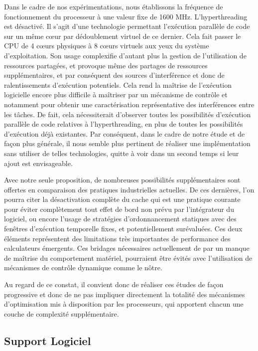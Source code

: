 \documentclass[french, a4paper, 11pt, twoside, pdftex]{StyleThese}
\begin{document}
		Dans le cadre de nos expérimentations, nous établissons la fréquence de fonctionnement du processeur à une valeur fixe de 1600 MHz. L'hyperthreading est désactivé. Il s'agit d'une technologie permettant l'exécution parallèle de code sur un même cœur par dédoublement virtuel de ce dernier. Cela fait passer  le CPU de 4 cœurs physiques à 8 cœurs virtuels aux yeux du système d'exploitation. Son usage complexifie d'autant plus la gestion de l'utilisation de ressources partagées, et provoque même des partages de ressources supplémentaires, et par conséquent des sources d'interférence et donc de ralentissements d'exécution potentiels. Cela rend la maîtrise de l'exécution logicielle encore plus difficile à maîtriser par un mécanisme de contrôle et notamment pour obtenir une caractérisation représentative des interférences entre les tâches. De fait, cela nécessiterait d'observer toutes les possibilités d'exécution parallèle de code relatives à l'hyperthreading, en plus de toutes les possibilités d'exécution déjà existantes. Par conséquent, dans le cadre de notre étude et de façon plus générale, il nous semble plus pertinent de réaliser une implémentation sans utiliser de telles technologies, quitte à voir dans un second temps si leur ajout est envisageable.
		
		Avec notre seule proposition, de nombreuses possibilités supplémentaires sont offertes en comparaison des pratiques industrielles actuelles. De ces dernières, l'on pourra citer la désactivation complète du cache qui est une pratique courante pour éviter complètement tout effet de bord non prévu par l'intégrateur du logiciel, ou encore l'usage de stratégies d'ordonnancement statiques avec des fenêtres d'exécution temporelle fixes, et potentiellement surévaluées. Ces deux éléments représentent des limitations très importantes de performance des calculateurs émergents. Ces bridages nécessaires actuellement de par un manque de maîtrise du comportement matériel, pourraient être évités avec l'utilisation de mécanismes de contrôle dynamique comme le nôtre. 
		
		Au regard de ce constat, il convient donc de réaliser ces études de façon progressive et donc de ne pas impliquer directement la totalité des mécanismes d'optimisation mis à disposition par les processeurs, qui apportent chacun une couche de complexité supplémentaire.
		
		\pagebreak
        \subsection{Support Logiciel}
        
\end{document}

